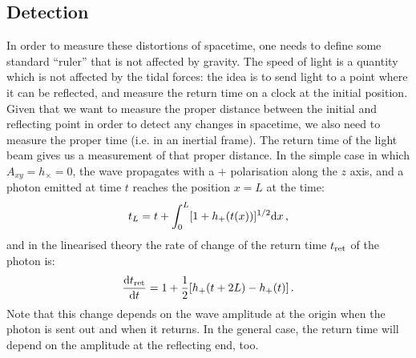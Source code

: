\subsection{Detection}
In order to measure these distortions of spacetime, one needs to define some standard ``ruler'' that is not affected by gravity. The speed of light is a quantity which is not affected by the tidal forces: the idea is to send light to a point where it can be reflected, and measure the return time on a clock at the initial position. Given that we want to measure the proper distance between the initial and reflecting point in order to detect any changes in spacetime, we also need to measure the proper time (i.e. in an inertial frame). The return time of the light beam gives us a measurement of that proper distance. In the simple case in which $A_{xy}=h_\times=0$, the wave propagates with a $+$ polarisation along the $z$ axis, and a photon emitted at time $t$ reaches the position $x=L$ at the time:
\begin{equation}
t_L=t+\int_0^L[1+h_+(t(x))]^{1/2} {\rm d} x \,,
\end{equation}
and in the linearised theory the rate of change of the return time $t_{\rm ret}$ of the photon is:
\begin{equation}
\frac{{\rm d}t_{\rm ret}}{{\rm d}t}=1+\frac{1}{2}[h_+(t+2L)-h_+(t)] \,. \label{eq:tret}
\end{equation}
Note that this change depends on the wave amplitude at the origin when the photon is sent out and when it returns. In the general case, the return time will depend on the amplitude at the reflecting end, too.
